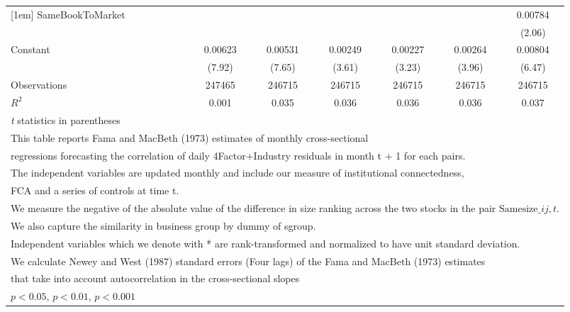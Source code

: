 {\begin{tabular}{l*{6}{c}}
[1em]
SameBookToMarket&                  &                  &                  &                  &                  &  0.00784\sym{*}  \\
                &                  &                  &                  &                  &                  &   (2.06)         \\
[1em]
Constant        &  0.00623\sym{***}&  0.00531\sym{***}&  0.00249\sym{***}&  0.00227\sym{**} &  0.00264\sym{***}&  0.00804\sym{***}\\
                &   (7.92)         &   (7.65)         &   (3.61)         &   (3.23)         &   (3.96)         &   (6.47)         \\
\hline
Observations    &   247465         &   246715         &   246715         &   246715         &   246715         &   246715         \\
\(R^{2}\)       &    0.001         &    0.035         &    0.036         &    0.036         &    0.036         &    0.037         \\
\hline\hline
\multicolumn{7}{l}{\footnotesize \textit{t} statistics in parentheses}\\
\multicolumn{7}{l}{\footnotesize This table reports Fama and MacBeth (1973) estimates of monthly cross-sectional}\\
\multicolumn{7}{l}{\footnotesize  regressions forecasting the correlation of daily 4Factor+Industry residuals in month t + 1 for each pairs.}\\
\multicolumn{7}{l}{\footnotesize The independent variables are updated monthly and include our measure of institutional connectedness,}\\
\multicolumn{7}{l}{\footnotesize  FCA and a series of controls at time t.}\\
\multicolumn{7}{l}{\footnotesize We measure the negative of the absolute value of the difference in size ranking across the two stocks in the pair $ \text{Samesize}\_{ij,t} $.}\\
\multicolumn{7}{l}{\footnotesize We also capture the similarity in business group by dummy of sgroup.}\\
\multicolumn{7}{l}{\footnotesize Independent variables which  we denote with * are rank-transformed and normalized to have unit standard deviation.}\\
\multicolumn{7}{l}{\footnotesize  We calculate Newey and West (1987) standard errors (Four lags) of the Fama and MacBeth (1973) estimates }\\
\multicolumn{7}{l}{\footnotesize  that take into account autocorrelation in the cross-sectional slopes}\\
\multicolumn{7}{l}{\footnotesize \sym{*} \(p<0.05\), \sym{**} \(p<0.01\), \sym{***} \(p<0.001\)}\\
\end{tabular}
}
